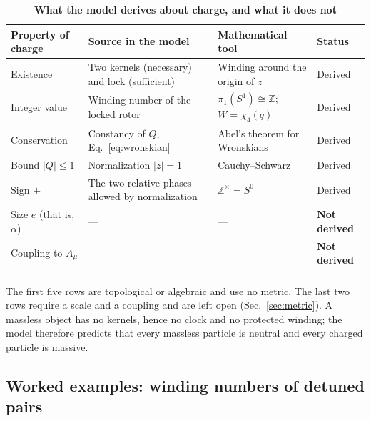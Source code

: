 \documentclass[%
 reprint, amsmath,amssymb, aps, prb, ]{revtex4-2}
\numberwithin{equation}{section}
\begin{document}
\begin{table}[t!]
\centering
\caption{\textbf{What the model derives about charge, and what it does not}}
\label{tab:charge}
\renewcommand{\arraystretch}{1.4}
\begin{tabular}{p{3.2cm}p{4.6cm}p{4.2cm}p{3.5cm}}
\toprule
\textbf{Property of charge} & \textbf{Source in the model} & \textbf{Mathematical tool} & \textbf{Status} \\
\midrule
Existence
& Two kernels (necessary) and lock (sufficient)
& Winding around the origin of $z$
& Derived \\
\addlinespace[0.3cm]
Integer value
& Winding number of the locked rotor
& $\pi_1(S^1)\cong\mathbb{Z}$; $W=\chi_4(q)$
& Derived \\
\addlinespace[0.3cm]
Conservation
& Constancy of $Q$, Eq.~\eqref{eq:wronskian}
& Abel's theorem for Wronskians~\cite{ref:coddington}
& Derived \\
\addlinespace[0.3cm]
Bound $|Q|\le1$
& Normalization $|z|=1$
& Cauchy--Schwarz
& Derived \\
\addlinespace[0.3cm]
Sign $\pm$
& The two relative phases allowed by normalization
& $\mathbb{Z}^\times=S^0$
& Derived \\
\addlinespace[0.3cm]
Size $e$ (that is, $\alpha$)
& ---
& ---
& \textbf{Not derived} \\
\addlinespace[0.3cm]
Coupling to $A_\mu$
& ---
& ---
& \textbf{Not derived} \\
\addlinespace[0.2cm]
\bottomrule
\end{tabular}
\vspace{0.2cm}
\begin{minipage}{0.95\textwidth}
\justifying\footnotesize
The first five rows are topological or algebraic and use no metric. The last two rows require a scale and a coupling and are left open (Sec.~\ref{sec:metric}). A massless object has no kernels, hence no clock and no protected winding; the model therefore predicts that every massless particle is neutral and every charged particle is massive.
\end{minipage}
\end{table}

\subsection{Worked examples: winding numbers of detuned pairs}
\end{document}

